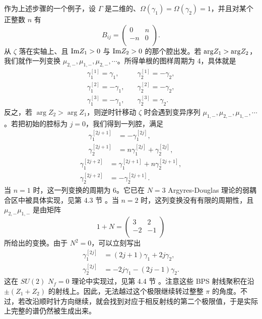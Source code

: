 作为上述步骤的一个例子，设 $\Gamma$ 是二维的、$\Omega(\gamma_1)=\Omega(\gamma_2)=1$，并且对某个正整数 $n$ 有
%
\begin{equation}
B_{ij} = \begin{pmatrix} 0 & n \\ -n & 0 \\ \end{pmatrix}.
\end{equation}
%
从 $\zeta$ 落在实轴上、且 ${\rm Im} Z_1 > 0 $ 与 ${\rm Im} Z_2 >0$ 的那个腔出发。若 ${\rm arg}Z_1 > {\rm arg} Z_2$，我们就作一列变换 $\mu_{2,-}, \mu_{1,-}, \mu_{2,-}, \cdots$。所得单根的图样周期为 4，具体就是
%
\begin{equation}
\begin{split}
\gamma_1^{[1]}=   \gamma_1, & \quad   \gamma_2^{[1]}= - \gamma_2, \\
\gamma_1^{[2]}= - \gamma_1, & \quad \gamma_2^{[2]}= -\gamma_2, \\
\gamma_1^{[3]}=  - \gamma_1, & \quad \gamma_2^{[3]}=  \gamma_2.
\end{split}
\end{equation}
%
反之，若 $\arg Z_2 > \arg Z_1$，则逆时针移动 $\zeta$ 时会遇到变异序列 $\mu_{1,-}, \mu_{2,-}, \mu_{1,-},\cdots$。若把初始的腔标为 $j=0$，我们得到一列腔，满足
%
\begin{equation}
\begin{split}
\gamma_1^{[2j+1]} & = -\gamma_1^{[2j]}  , \\
\gamma_2^{[2j+1]} & = n\gamma_1^{[2j]}+ \gamma_2^{[2j]},
\end{split}
\end{equation}
%
\begin{equation}
\begin{split}
\gamma_1^{[2j+2]} & =\gamma_1^{[2j+1]}+ n\gamma_2^{[2j+1]},   \\
\gamma_2^{[2j+2]} & =  - \gamma_2^{[2j+1]}.
\end{split}
\end{equation}
%
当 $n=1$ 时，这一列变换的周期为 $6$。它已在 $N=3$ Argyres-Douglas 理论的弱耦合区中被具体实现，见第 4.3 节%
。当 $n=2$ 时，这列变换没有有限的周期性，且 $\mu_{2,-}\mu_{1,-}$ 是由矩阵
%
\begin{equation}
1 + N = \begin{pmatrix} 3 & 2 \\ -2 & -1 \\ \end{pmatrix}
\end{equation}
%
所给出的变换。由于 $N^2 =0$，可以立刻写出
%
\begin{equation}
\begin{split}
\gamma^{[2j]}_1 & = (2j+1)\gamma_1 + 2j  \gamma_2, \\
\gamma^{[2j]}_2 & =  -2j \gamma_1  -  (2j-1) \gamma_2.
\end{split}
\end{equation}
%
这在 $SU(2)$ $N_f=0$ 理论中实现过，见第 4.4 节%
。注意这些 BPS 射线聚积在沿 $\pm (Z_1 + Z_2)$ 的射线上。因此，无法越过这个极限继续转过整整 $\pi$ 的角度。不过，若改沿顺时针方向继续，就会找到对应于相反射线的第二个极限值，于是实际上完整的谱仍然被生成出来。

